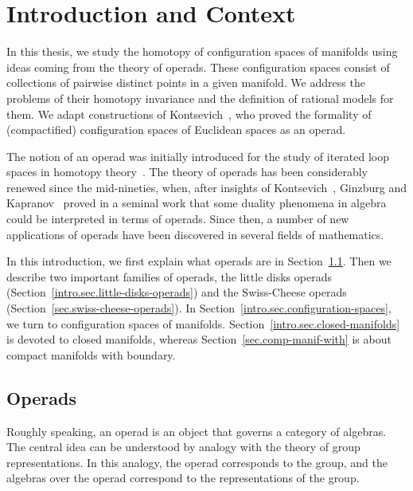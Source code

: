 
\setcounter{chapter}{-1}
\chapter{Introduction and Context}
\label{chap.intro}

In this thesis, we study the homotopy of configuration spaces of manifolds using ideas coming from the theory of operads.
These configuration spaces consist of collections of pairwise distinct points in a given manifold.
We address the problems of their homotopy invariance and the definition of rational models for them.
We adapt constructions of Kontsevich~\cite{Kontsevich1999}, who proved the formality of (compactified) configuration spaces of Euclidean spaces as an operad.

The notion of an operad was initially introduced for the study of iterated loop spaces in homotopy theory~\cite{May1972,BoardmanVogt1973}.
The theory of operads has been considerably renewed since the mid-nineties, when, after insights of Kontsevich~\cite{Kontsevich1993a}, Ginzburg and Kapranov~\cite{GinzburgKapranov1994} proved in a seminal work that some duality phenomena in algebra could be interpreted in terms of operads.
Since then, a number of new applications of operads have been discovered in several fields of mathematics.

In this introduction, we first explain what operads are in Section~\ref{intro.sec.operads}.
Then we describe two important families of operads, the little disks operads (Section~\ref{intro.sec.little-disks-operads}) and the Swiss-Cheese operads (Section~\ref{sec.swiss-cheese-operads}).
In Section~\ref{intro.sec.configuration-spaces}, we turn to configuration spaces of manifolds.
Section~\ref{intro.sec.closed-manifolds} is devoted to closed manifolds, whereas Section~\ref{sec.comp-manif-with} is about compact manifolds with boundary.

\section{Operads}
\label{intro.sec.operads}

Roughly speaking, an operad is an object that governs a category of algebras.
The central idea can be understood by analogy with the theory of group representations.
In this analogy, the operad corresponds to the group, and the algebras over the operad correspond to the representations of the group.

